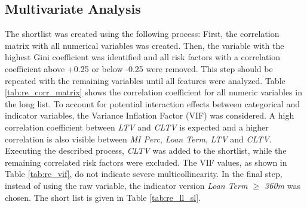 \subsection{Multivariate Analysis}

The shortlist was created using the following process: First, the correlation matrix with all numerical variables was created. Then, the variable with the highest Gini coefficient was identified and all risk factors with a correlation coefficient above +0.25 or below -0.25 were removed. This step should be repeated with the remaining variables until all features were analyzed. 
Table \ref{tab:re_corr_matrix} shows the correlation coefficient for all numeric variables in the long list. To account for potential interaction effects between categorical and indicator variables, the Variance Inflation Factor (VIF) was considered. A high correlation coefficient between \emph{LTV} and \emph{CLTV} is expected and a higher correlation is also visible between \emph{MI Perc}, \emph{Loan Term}, \emph{LTV} and \emph{CLTV}. Executing the described process, \emph{CLTV} was added to the shortlist, while the remaining correlated risk factors were excluded.  The VIF values, as shown in Table \ref{tab:re_vif}, do not indicate severe multicollinearity. In the final step, instead of using the raw variable, the indicator version \emph{Loan Term $\geq$ 360m} was chosen. The short list is given in Table \ref{tab:re_ll_sl}.

